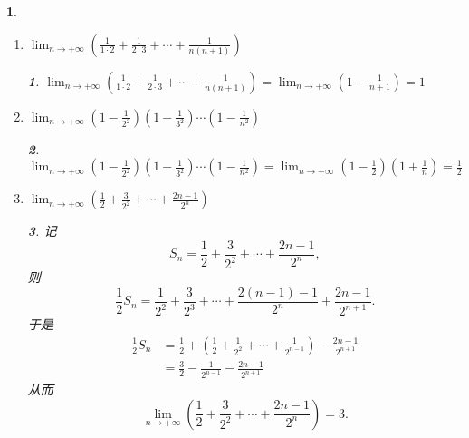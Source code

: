 \documentclass[utf8]{book}
\newtheorem{example}{}[section]             %
\newtheorem{solution}{}
\begin{document}
\begin{example}
\begin{enumerate}
\item $\displaystyle \lim_{n\to +\infty}\left(\frac{1}{1\cdot 2}+\frac{1}{2\cdot 3} +\cdots+\frac{1}{n(n+1)}\right)$
\begin{solution}
$\displaystyle \lim_{n\to +\infty}\left(\frac{1}{1\cdot 2}+\frac{1}{2\cdot 3} +\cdots+\frac{1}{n(n+1)}\right) = 
\lim_{n\to +\infty}\left(1 - \frac{1}{n+1}\right) = 1$
\end{solution}

\item $\displaystyle \lim_{n\to +\infty}\left(1-\frac{1}{2^2}\right)\left(1-\frac{1}{3^2}\right)\cdots\left(1-\frac{1}{n^2}\right)$
\begin{solution}
$\displaystyle \lim_{n\to +\infty}\left(1-\frac{1}{2^2}\right)\left(1-\frac{1}{3^2}\right)\cdots\left(1-\frac{1}{n^2}\right) = 
\lim_{n\to +\infty}\left(1 - \frac{1}{2}\right)\left(1 + \frac{1}{n}\right) = \frac{1}{2}$
\end{solution}

\item $\displaystyle \lim_{n\to +\infty}\left(\frac{1}{2}+\frac{3}{2^2}+\cdots+\frac{2n-1}{2^n}\right)$
\begin{solution}
记$$S_n = \frac{1}{2}+\frac{3}{2^2}+\cdots+\frac{2n-1}{2^n},$$ 则
$$\frac{1}{2}S_n = \frac{1}{2^2}+\frac{3}{2^3}+\cdots+\frac{2(n-1)-1}{2^{n}}+\frac{2n-1}{2^{n+1}}.$$
于是
\begin{equation*}
\begin{split}
\frac{1}{2}S_n &= \frac{1}{2}+\left(\frac{1}{2} + \frac{1}{2^2}+\cdots+\frac{1}{2^{n-1}}\right)-\frac{2n-1}{2^{n+1}}\\
&=\frac{3}{2}-\frac{1}{2^{n-1}}-\frac{2n-1}{2^{n+1}}
\end{split}
\end{equation*}
从而$$\displaystyle \lim_{n\to +\infty}\left(\frac{1}{2}+\frac{3}{2^2}+\cdots+\frac{2n-1}{2^n}\right) = 3.$$
\end{solution}


\end{enumerate}
\end{example}
\end{document}
